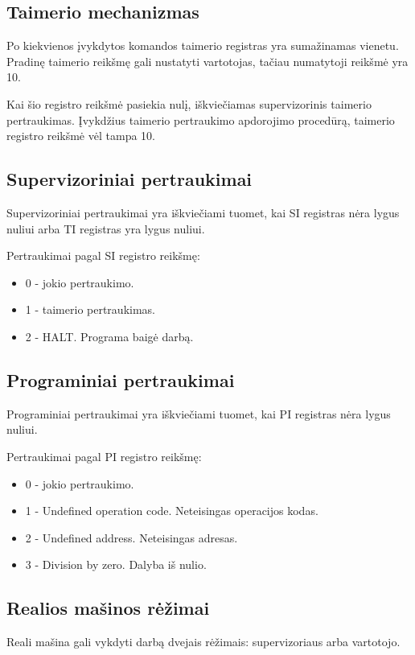 	\subsection{Taimerio mechanizmas}
	Po kiekvienos įvykdytos komandos taimerio registras yra sumažinamas vienetu. Pradinę taimerio reikšmę gali nustatyti vartotojas, tačiau numatytoji reikšmė yra 10.
	
	Kai šio registro reikšmė pasiekia nulį, iškviečiamas supervizorinis taimerio pertraukimas. Įvykdžius taimerio pertraukimo apdorojimo procedūrą, taimerio registro reikšmė vėl tampa 10.
	
	\subsection{Supervizoriniai pertraukimai}
	Supervizoriniai pertraukimai yra iškviečiami tuomet, kai SI registras nėra lygus nuliui arba TI registras yra lygus nuliui.
	
	Pertraukimai pagal SI registro reikšmę:
	\begin{itemize}
	\item 0 - jokio pertraukimo.
	\item 1 - taimerio pertraukimas.
	\item 2 - HALT. Programa baigė darbą. 
	\end{itemize}
	
	\subsection{Programiniai pertraukimai}
	Programiniai pertraukimai yra iškviečiami tuomet, kai PI registras nėra lygus nuliui.
	
	Pertraukimai pagal PI registro reikšmę:
	\begin{itemize}
	\item 0 - jokio pertraukimo.
	\item 1 - Undefined operation code. Neteisingas operacijos kodas.
	\item 2 - Undefined address. Neteisingas adresas.
	\item 3 - Division by zero. Dalyba iš nulio.
	\end{itemize}
	
	\subsection{Realios mašinos rėžimai}
	Reali mašina gali vykdyti darbą dvejais rėžimais: supervizoriaus arba vartotojo. 
	
